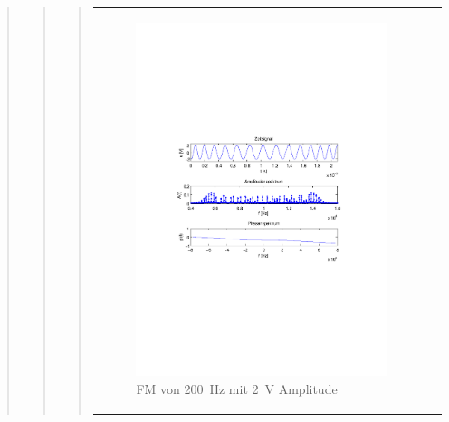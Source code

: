\begin{quote}
\begin{quote}
\begin{quote}
\begin{center}
\begin{tabular}{ll}
                \begin{minipage}{0.6\textwidth}
                    \begin{figure}[H]
                        \label{fig:f100_1}
                        \includegraphics[scale=0.7, trim = 35mm 100mm 35mm 95mm, clip]{Bilder/f200_2}
                        \caption{FM von \SI{200}{\hertz} mit \SI{2}{\volt} Amplitude}
                    \end{figure}
                \end{minipage}
            
            \end{tabular}
            \end{center}            
        \end{quote}


        
        

\end{quote}
\end{quote}
